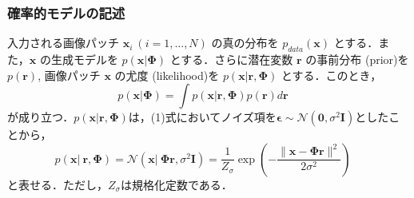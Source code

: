 \subsubsection{確率的モデルの記述}入力される画像パッチ $\mathbf{x}_i\ (i=1, \ldots, N)$ の真の分布を $p_{data}(\mathbf{x})$ とする．また，$\mathbf{x}$ の生成モデルを $p(\mathbf{x}|\mathbf{\Phi})$ とする．さらに潜在変数 $\mathbf{r}$ の事前分布 (prior)を $p(\mathbf{r})$, 画像パッチ $\mathbf{x}$ の尤度 (likelihood)を $p(\mathbf{x}|\mathbf{r}, \mathbf{\Phi})$ とする．このとき，
$$
p(\mathbf{x}|\mathbf{\Phi})=\int p(\mathbf{x}|\mathbf{r}, \mathbf{\Phi})p(\mathbf{r})d\mathbf{r} \quad \tag{2}
$$
が成り立つ．$p(\mathbf{x}|\mathbf{r}, \mathbf{\Phi})$は，(1)式においてノイズ項を$\boldsymbol{\epsilon} \sim\mathcal{N}(\mathbf{0}, \sigma^2 \mathbf{I})$としたことから，
$$
p(\mathbf{x}|\ \mathbf{r}, \mathbf{\Phi})=\mathcal{N}\left(\mathbf{x}|\ \mathbf{\Phi} \mathbf{r}, \sigma^2 \mathbf{I} \right)=\frac{1}{Z_{\sigma}} \exp\left(-\frac{\|\mathbf{x} - \mathbf{\Phi} \mathbf{r}\|^2}{2\sigma^2}\right)\quad \tag{3}
$$
と表せる．ただし，$Z_{\sigma}$は規格化定数である．